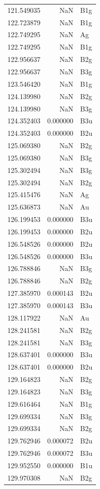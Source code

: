 \begin{longtable}{rrl}
121.549035 & NaN & B1g \\
122.723879 & NaN & B1g \\
122.749295 & NaN & Ag \\
122.749295 & NaN & B1g \\
122.956637 & NaN & B2g \\
122.956637 & NaN & B3g \\
123.546420 & NaN & B1g \\
124.139980 & NaN & B2g \\
124.139980 & NaN & B3g \\
124.352403 & 0.000000 & B3u \\
124.352403 & 0.000000 & B2u \\
125.069380 & NaN & B2g \\
125.069380 & NaN & B3g \\
125.302494 & NaN & B3g \\
125.302494 & NaN & B2g \\
125.415476 & NaN & Ag \\
125.636873 & NaN & Au \\
126.199453 & 0.000000 & B3u \\
126.199453 & 0.000000 & B2u \\
126.548526 & 0.000000 & B2u \\
126.548526 & 0.000000 & B3u \\
126.788846 & NaN & B3g \\
126.788846 & NaN & B2g \\
127.385970 & 0.000143 & B2u \\
127.385970 & 0.000143 & B3u \\
128.117922 & NaN & Au \\
128.241581 & NaN & B2g \\
128.241581 & NaN & B3g \\
128.637401 & 0.000000 & B3u \\
128.637401 & 0.000000 & B2u \\
129.164823 & NaN & B2g \\
129.164823 & NaN & B3g \\
129.616464 & NaN & B1g \\
129.699334 & NaN & B3g \\
129.699334 & NaN & B2g \\
129.762946 & 0.000072 & B2u \\
129.762946 & 0.000072 & B3u \\
129.952550 & 0.000000 & B1u \\
129.970308 & NaN & B2g \\

\end{longtable}
